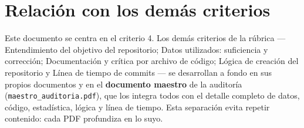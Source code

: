 \section{Relación con los demás criterios}

Este documento se centra en el criterio 4. Los demás criterios de la
rúbrica — Entendimiento del objetivo del repositorio; Datos utilizados: suficiencia y corrección; Documentación y crítica por archivo de código; Lógica de creación del repositorio y Línea de tiempo de commits — se desarrollan a fondo en sus propios documentos
y en el \textbf{documento maestro} de la auditoría (\texttt{maestro\_auditoria.pdf}),
que los integra todos con el detalle completo de datos, código, estadística,
lógica y línea de tiempo. Esta separación evita repetir contenido: cada PDF
profundiza en lo suyo.
